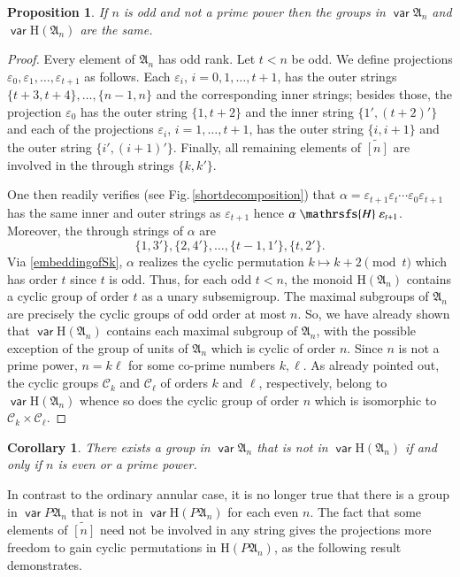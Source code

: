 \documentclass[preprint,1p,times]{elsarticle}
\DeclareMathOperator{\var}{\mathsf{var}}
\numberwithin{equation}{section}
\newtheorem{Prop}[Thm]{Proposition}
\newtheorem{Cor}[Thm]{Corollary}
\theoremstyle{remark}
\def\Hc{\mathrsfs{H}}
\def\al{\alpha}
\def\ep{\varepsilon}
\def\H{\mathrm H}
\def\A{\mathfrak{A}}
\def\wt{\widetilde}
\begin{document}
\begin{Prop}
\label{noprimepowerodd} If $n$ is odd and not a prime power then the groups in $\var\A_n$ and $\var\H(\A_n)$ are the
same.
\end{Prop}
\begin{proof} Every element of $\A_n$ has odd rank. Let $t<n$ be odd.
We define projections $\ep_0,\ep_1,\dots,\ep_{t+1}$ as follows. Each $\ep_i$, $i=0,1,\dots,t+1$, has the outer strings
$\{t+3,t+4\},\dots,\{n-1,n\}$ and the corresponding inner strings; besides those, the projection $\ep_0$ has the outer
string $\{1,t+2\}$ and the inner string $\{1',(t+2)'\}$ and each of the projections $\ep_i$, $i=1,\dots,t+1$, has the
outer string $\{i,i+1\}$ and the outer string $\{i',(i+1)'\}$. Finally, all remaining elements of $\wt{[n]}$ are
involved in the through strings  $\{k,k'\}$.

One then readily verifies (see Fig.\,\ref{shortdecomposition}) that $\al=\ep_{t+1}\ep_t\cdots \ep_0\ep_{t+1}$ has the
same inner and outer strings as $\ep_{t+1}$ hence $\al\mathrel{\Hc}\ep_{t+1}$. Moreover, the through strings of $\al$
are
$$\{1,3'\},\{2,4'\},\dots,\{t-1,1'\},\{t,2'\}.$$
Via \eqref{embeddingofSk}, $\al$ realizes the cyclic permutation $k\mapsto k+2\!\pmod{t}$ which has order $t$ since $t$
is odd. Thus, for each odd $t<n$, the monoid $\H(\A_n)$ contains a cyclic group of order $t$ as a unary subsemigroup.
The maximal subgroups of $\A_n$ are precisely the cyclic groups of odd order at most $n$. So, we have already shown
that $\var\H(\A_n)$ contains each maximal subgroup of $\A_n$, with the possible exception of the group of units of
$\A_n$ which is cyclic of order $n$. Since $n$ is not a prime power, $n=k\ell$ for some co-prime numbers $k,\ell$. As
already pointed out, the cyclic groups $\mathcal{C}_k$ and $\mathcal{C}_\ell$ of orders $k$ and $\ell$, respectively,
belong to $\var\H(\A_n)$ whence so does the cyclic group of order $n$ which is isomorphic to $\mathcal{C}_k
\times\mathcal{C}_\ell$.
\end{proof}
\begin{Cor} There exists a group in $\var\A_n$ that is not in
$\var\H(\A_n)$ if and only if $n$ is even or a prime power.
\end{Cor}


In contrast to the ordinary annular case, it is no longer true that there is a group in $\var P\A_n$ that is not in
$\var\H(P\A_n)$ for each even $n$. The fact that some elements of $\wt{[n]}$ need not be involved in any string gives
the projections more freedom to gain cyclic permutations in $\H(P\A_n)$, as the following result demonstrates.
\end{document}

